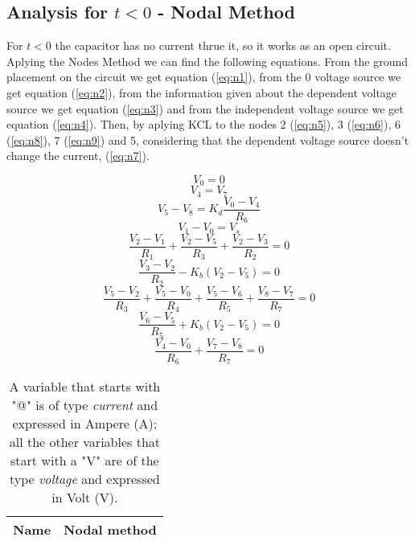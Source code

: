 \subsection{Analysis for $t<0$ - Nodal Method} 
For $t<0$ the capacitor has no current thrue it, so it works as an open circuit. Aplying the Nodes Method we can find the following equations. From the ground placement on the circuit we get equation (\ref{eq:n1}), from the 0 voltage source we get equation (\ref{eq:n2}), from the information given about the dependent voltage source we get equation (\ref{eq:n3}) and from the independent voltage source we get equation (\ref{eq:n4}). Then, by aplying KCL to the nodes 2 (\ref{eq:n5}), 3 (\ref{eq:n6}), 6 (\ref{eq:n8}), 7 (\ref{eq:n9}) and 5, considering that the dependent voltage source doesn't change the current, (\ref{eq:n7}).\par
\begin {equation}
V_0 = 0
\label{eq:n1}
\end{equation}
\begin {equation}
V_4 = V_7
\label{eq:n2}
\end{equation}
\begin {equation}
	V_5 - V_8 = K_d \frac{V_0 - V_4}{R_6}
	\label{eq:n3}
\end{equation}
\begin {equation}
	V_1 - V_0 = V_s
	\label{eq:n4}
\end{equation}
\begin {equation}
	\frac{V_2-V_1}{R_1} + \frac{V_2 - V_5}{R_3} + \frac{V_2 - V_3}{R_2} = 0
	\label{eq:n5}
\end{equation}
\begin {equation}
	\frac{V_3-V_2}{R_2} - K_b(V_2-V_5)  = 0
	\label{eq:n6}
\end{equation}
\begin {equation}
	\frac{V_5-V_2}{R_3} + \frac{V_5-V_0}{R_4} + \frac{V_5-V_6}{R_5} + \frac{V_8-V_7}{R_7}= 0
	\label{eq:n7}
\end{equation}
\begin {equation}
	\frac{V_6-V_5}{R_5} + K_b(V_2-V_5)  = 0
	\label{eq:n8}
\end{equation}
\begin {equation}
	\frac{V_4-V_0}{R_6} + \frac{V_7 - V_8}{R_7} = 0
	\label{eq:n9}
\end{equation}



\begin{table}[H]

  \centering 
  \begin{tabular}{|l|r|}
    \hline    
    {\bf Name} & {\bf Nodal method}\\ \hline
    
  \end{tabular}
  \vspace{10px}
  \caption{A variable that starts with "@" is of type {\em current}
    and expressed in Ampere (A); all the other variables that start with a "V" are of the type {\it voltage} and expressed in
    Volt (V).}
  \label{tab:theoretical}
  
\end{table}



